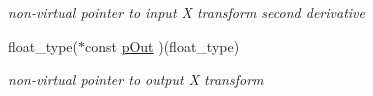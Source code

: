 \begin{DoxyCompactItemize}
\begin{DoxyCompactList}\small\item\em non-\/virtual pointer to input X transform second derivative \end{DoxyCompactList}\item 
\hypertarget{classc2__transformation_a4cc519a54974378efb82c1449c613cb7}{float\-\_\-type($\ast$const \hyperlink{classc2__transformation_a4cc519a54974378efb82c1449c613cb7}{p\-Out} )(float\-\_\-type)}\label{classc2__transformation_a4cc519a54974378efb82c1449c613cb7}

\begin{DoxyCompactList}\small\item\em non-\/virtual pointer to output X transform \end{DoxyCompactList}\end{DoxyCompactItemize}
